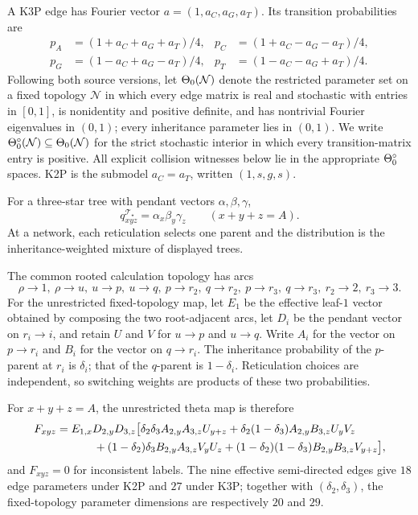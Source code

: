 \documentclass[11pt]{article}
\theoremstyle{remark}\newtheorem{remark}[theorem]{Remark}
\newcommand{\Tstar}{\mathcal T_\star}\newcommand{\Ntheta}{\mathcal N_\theta}
\begin{document}
A K3P edge has Fourier vector $a=(1,a_C,a_G,a_T)$. Its transition probabilities are
\begin{align*}
p_A&=(1+a_C+a_G+a_T)/4,&p_C&=(1+a_C-a_G-a_T)/4,\\
p_G&=(1-a_C+a_G-a_T)/4,&p_T&=(1-a_C-a_G+a_T)/4.
\end{align*}
Following both source versions, let $\Theta_0(\mathcal N)$ denote the restricted parameter set on a fixed topology $\mathcal N$ in which every edge matrix is real and stochastic with entries in $[0,1]$, is nonidentity and positive definite, and has nontrivial Fourier eigenvalues in $(0,1)$; every inheritance parameter lies in $(0,1)$. We write $\Theta_0^\circ(\mathcal N)\subseteq\Theta_0(\mathcal N)$ for the strict stochastic interior in which every transition-matrix entry is positive. All explicit collision witnesses below lie in the appropriate $\Theta_0^\circ$ spaces. K2P is the submodel $a_C=a_T$, written $(1,s,g,s)$.

For a three-star tree with pendant vectors $\alpha,\beta,\gamma$,
\[
q^{\Tstar}_{xyz}=\alpha_x\beta_y\gamma_z\qquad(x+y+z=A).
\]
At a network, each reticulation selects one parent and the distribution is the inheritance-weighted mixture of displayed trees.

The common rooted calculation topology has arcs
\begin{equation}\label{eq:arcs}
\rho\to1,\ \rho\to u,\ u\to p,\ u\to q,\ p\to r_2,\ q\to r_2,\ p\to r_3,\ q\to r_3,\ r_2\to2,\ r_3\to3.
\end{equation}
For the unrestricted fixed-topology map, let $E_1$ be the effective leaf-$1$ vector obtained by composing the two root-adjacent arcs, let $D_i$ be the pendant vector on $r_i\to i$, and retain $U$ and $V$ for $u\to p$ and $u\to q$. Write $A_i$ for the vector on $p\to r_i$ and $B_i$ for the vector on $q\to r_i$. The inheritance probability of the $p$-parent at $r_i$ is $\delta_i$; that of the $q$-parent is $1-\delta_i$. Reticulation choices are independent, so switching weights are products of these two probabilities.

For $x+y+z=A$, the unrestricted theta map is therefore
\begin{align}\label{eq:theta-map}
F_{xyz}={}&E_{1,x}D_{2,y}D_{3,z}\bigl[
\delta_2\delta_3 A_{2,y}A_{3,z}U_{y+z}
+\delta_2(1-\delta_3)A_{2,y}B_{3,z}U_yV_z\notag\\
&\qquad +(1-\delta_2)\delta_3B_{2,y}A_{3,z}V_yU_z
+(1-\delta_2)(1-\delta_3)B_{2,y}B_{3,z}V_{y+z}\bigr],
\end{align}
and $F_{xyz}=0$ for inconsistent labels. The nine effective semi-directed edges give $18$ edge parameters under K2P and $27$ under K3P; together with $(\delta_2,\delta_3)$, the fixed-topology parameter dimensions are respectively $20$ and $29$.
\end{document}
